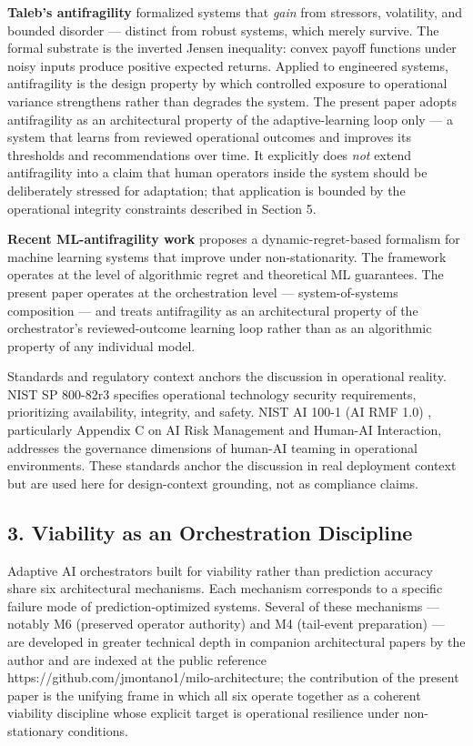\textbf{Taleb's antifragility} \cite{ref3} formalized systems that
\emph{gain} from stressors, volatility, and bounded disorder ---
distinct from robust systems, which merely survive. The formal substrate
is the inverted Jensen inequality: convex payoff functions under noisy
inputs produce positive expected returns. Applied to engineered systems,
antifragility is the design property by which controlled exposure to
operational variance strengthens rather than degrades the system. The
present paper adopts antifragility as an architectural property of the
adaptive-learning loop only --- a system that learns from reviewed
operational outcomes and improves its thresholds and recommendations
over time. It explicitly does \emph{not} extend antifragility into a
claim that human operators inside the system should be deliberately
stressed for adaptation; that application is bounded by the operational
integrity constraints described in Section 5.

\textbf{Recent ML-antifragility work} \cite{ref7} proposes a
dynamic-regret-based formalism for machine learning systems that improve
under non-stationarity. The framework operates at the level of
algorithmic regret and theoretical ML guarantees. The present paper
operates at the orchestration level --- system-of-systems composition
--- and treats antifragility as an architectural property of the
orchestrator's reviewed-outcome learning loop rather than as an
algorithmic property of any individual model.

Standards and regulatory context anchors the discussion in operational
reality. NIST SP 800-82r3 \cite{ref9} specifies operational technology
security requirements, prioritizing availability, integrity, and safety.
NIST AI 100-1 (AI RMF 1.0) \cite{ref10}, particularly Appendix C on AI Risk
Management and Human-AI Interaction, addresses the governance dimensions
of human-AI teaming in operational environments. These standards anchor
the discussion in real deployment context but are used here for
design-context grounding, not as compliance claims.

\subsection{3. Viability as an Orchestration
Discipline}\label{viability-as-an-orchestration-discipline}

Adaptive AI orchestrators built for viability rather than prediction
accuracy share six architectural mechanisms. Each mechanism corresponds
to a specific failure mode of prediction-optimized systems. Several of
these mechanisms --- notably M6 (preserved operator authority) and M4
(tail-event preparation) --- are developed in greater technical depth in
companion architectural papers by the author and are indexed at the
public reference https://github.com/jmontano1/milo-architecture; the
contribution of the present paper is the unifying frame in which all six
operate together as a coherent viability discipline whose explicit
target is operational resilience under non-stationary conditions.

